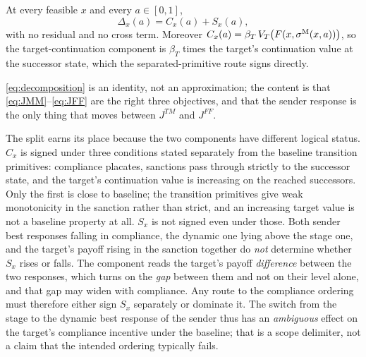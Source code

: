 \begin{proposition}
\label{prop:two-channel}
At every feasible $x$ and every $a\in[0,1]$,
\begin{equation}
\Delta_x(a)=C_x(a)+S_x(a),
\label{eq:decomposition}
\end{equation}
with no residual and no cross term. Moreover
$C_x(a)=\beta_T\,V_T\bigl(F(x,\sigma^{\mathrm{M}}(x,a))\bigr)$, so the target-continuation
component is $\beta_T$ times the target's continuation value at the successor state, which the separated-primitive
route signs directly.
\end{proposition}

\eqref{eq:decomposition} is an identity, not an approximation; the content is
that \eqref{eq:JMM}--\eqref{eq:JFF} are the right three objectives, and that the
sender response is the only thing that moves between $J^{TM}$ and $J^{FF}$.

The split earns its place because the two components have different logical
status. $C_x$ is signed under three conditions stated separately from the
baseline transition primitives: compliance placates, sanctions pass through
strictly to the successor state, and the target's continuation value is
increasing on the reached successors. Only the first is close to baseline; the
transition primitives give weak monotonicity in the sanction rather than strict,
and an increasing target value is not a baseline property at all. $S_x$ is not
signed even under those. Both sender best responses falling in compliance, the dynamic one lying
above the stage one, and the target's payoff rising in the sanction together do
\emph{not} determine whether $S_x$ rises or falls. The component reads the
target's payoff \emph{difference} between the two responses, which turns on the
\emph{gap} between them and not on their level alone, and that gap may widen
with compliance. Any route to the
compliance ordering must therefore either sign $S_x$ separately or dominate it.
The switch from the stage to the dynamic best response of the sender thus has an
\emph{ambiguous} effect on the target's compliance incentive under the baseline;
that is a scope delimiter, not a claim that the intended ordering typically
fails.

